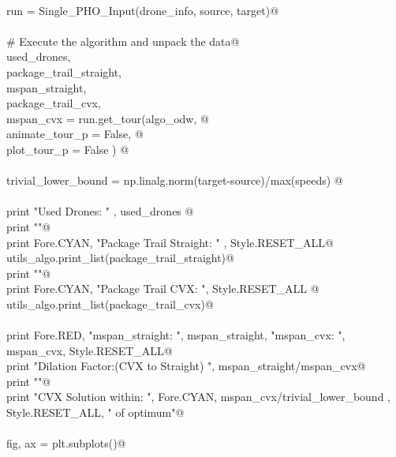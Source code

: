 \documentclass[10.0pt]{report}
\begin{document}
\begin{flushleft}
\begin{minipage}{\linewidth}
\begin{list}{}{}
\mbox{}\verb@@\\
\mbox{}\verb@    run = Single_PHO_Input(drone_info, source, target)@\\
\mbox{}\verb@@\\
\mbox{}\verb@    # Execute the algorithm and unpack the data@\\
\mbox{}\verb@    used_drones,           \@\\
\mbox{}\verb@    package_trail_straight,\@\\
\mbox{}\verb@    mspan_straight,        \@\\
\mbox{}\verb@    package_trail_cvx,     \@\\
\mbox{}\verb@    mspan_cvx = run.get_tour(algo_odw, @\\
\mbox{}\verb@                             animate_tour_p = False, @\\
\mbox{}\verb@                             plot_tour_p    = False )     @\\
\mbox{}\verb@@\\
\mbox{}\verb@    trivial_lower_bound = np.linalg.norm(target-source)/max(speeds) @\\
\mbox{}\verb@@\\
\mbox{}\verb@    print "Used Drones: "   , used_drones @\\
\mbox{}\verb@    print "\n"@\\
\mbox{}\verb@    print Fore.CYAN, "Package Trail Straight: " , Style.RESET_ALL@\\
\mbox{}\verb@    utils_algo.print_list(package_trail_straight)@\\
\mbox{}\verb@    print "\n"@\\
\mbox{}\verb@    print Fore.CYAN, "Package Trail CVX: ", Style.RESET_ALL        @\\
\mbox{}\verb@    utils_algo.print_list(package_trail_cvx)@\\
\mbox{}\verb@@\\
\mbox{}\verb@    print Fore.RED, "mspan_straight: ",  mspan_straight, "\n mspan_cvx:      ", mspan_cvx, Style.RESET_ALL@\\
\mbox{}\verb@    print "Dilation Factor:(CVX to Straight) ", mspan_straight/mspan_cvx@\\
\mbox{}\verb@    print ""@\\
\mbox{}\verb@    print "CVX Solution within: ", Fore.CYAN,  mspan_cvx/trivial_lower_bound , Style.RESET_ALL, " of optimum\n"@\\
\mbox{}\verb@@\\
\mbox{}\verb@    fig, ax = plt.subplots()@\\

\end{list}
\end{minipage}
\end{flushleft}
\end{document}
